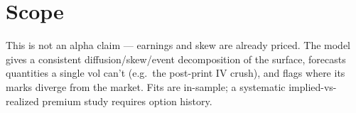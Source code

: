 \documentclass[11pt]{article}
\begin{document}
\section{Scope}

This is not an alpha claim --- earnings and skew are already priced. The model gives a
consistent diffusion/skew/event decomposition of the surface, forecasts quantities
a single vol can't (e.g.\ the post-print IV crush), and flags where its marks
diverge from the market. Fits are in-sample; a systematic implied-vs-realized
premium study requires option history.
\end{document}
